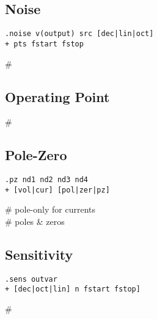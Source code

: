 \subsection*{Noise}
\begin{lstlisting}
.noise v(output) src [dec|lin|oct] 
+ pts fstart fstop
\end{lstlisting}
 \# {\scriptsize }\\

\subsection*{Operating Point}
 \# {\scriptsize }\\[1mm]

\subsection*{Pole-Zero}
\begin{lstlisting}
.pz nd1 nd2 nd3 nd4 
+ [vol|cur] [pol|zer|pz]
\end{lstlisting}
 \# {\scriptsize pole-only for currents}\\
 \# {\scriptsize poles \& zeros}\\

\subsection*{Sensitivity}
\begin{lstlisting}
.sens outvar
+ [dec|oct|lin] n fstart fstop]
\end{lstlisting}
 \# {\scriptsize }\\
 \\

